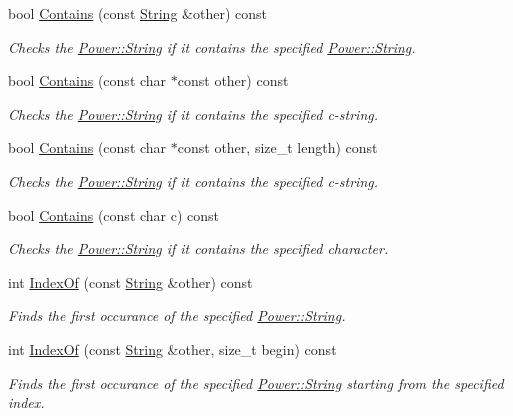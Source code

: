 \begin{DoxyCompactItemize}
bool \hyperlink{class_power_1_1_string_aeaa32e499b49e67539953355b53609a8}{Contains} (const \hyperlink{class_power_1_1_string}{String} \&other) const
\begin{DoxyCompactList}\small\item\em Checks the \hyperlink{class_power_1_1_string}{Power\+::\+String} if it contains the specified \hyperlink{class_power_1_1_string}{Power\+::\+String}. \end{DoxyCompactList}\item 
bool \hyperlink{class_power_1_1_string_ad90a05c6e07bcd98684bd7c2aec7723f}{Contains} (const char $\ast$const other) const
\begin{DoxyCompactList}\small\item\em Checks the \hyperlink{class_power_1_1_string}{Power\+::\+String} if it contains the specified c-\/string. \end{DoxyCompactList}\item 
bool \hyperlink{class_power_1_1_string_a7ed6567e4c08c0b61f415039a665d3ff}{Contains} (const char $\ast$const other, size\+\_\+t length) const
\begin{DoxyCompactList}\small\item\em Checks the \hyperlink{class_power_1_1_string}{Power\+::\+String} if it contains the specified c-\/string. \end{DoxyCompactList}\item 
bool \hyperlink{class_power_1_1_string_a728af5dfae32933d8548a657d7cd2043}{Contains} (const char c) const
\begin{DoxyCompactList}\small\item\em Checks the \hyperlink{class_power_1_1_string}{Power\+::\+String} if it contains the specified character. \end{DoxyCompactList}\item 
int \hyperlink{class_power_1_1_string_a91a17a73900ea3e77e01f6d816a5bb39}{Index\+Of} (const \hyperlink{class_power_1_1_string}{String} \&other) const
\begin{DoxyCompactList}\small\item\em Finds the first occurance of the specified \hyperlink{class_power_1_1_string}{Power\+::\+String}. \end{DoxyCompactList}\item 
int \hyperlink{class_power_1_1_string_aa4e196eae877f4f169269283bf677b9c}{Index\+Of} (const \hyperlink{class_power_1_1_string}{String} \&other, size\+\_\+t begin) const
\begin{DoxyCompactList}\small\item\em Finds the first occurance of the specified \hyperlink{class_power_1_1_string}{Power\+::\+String} starting from the specified index. \end{DoxyCompactList}\item 

\end{DoxyCompactItemize}
